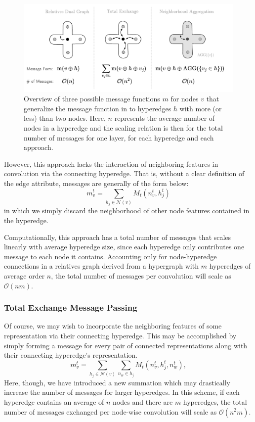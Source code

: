 \documentclass[10pt,a4paper,twocolumn]{article}
\begin{document}
\begin{figure}
	\centering
	\includegraphics[scale=.81]{HMPNN.pdf}
	\caption{Overview of three possible message functions $m$ for nodes $v$ that generalize the message function in \cite{mpnn} to hyperedges $h$ with more (or less) than two nodes. Here, $n$ represents the average number of nodes in a hyperedge and the scaling relation is then for the total number of messages for one layer, for each hyperedge and each approach.}
	\label{fig:hmpnn}
\end{figure}

However, this approach lacks the interaction of neighboring features in convolution via the connecting hyperedge. That is, without a clear definition of the edge attribute, messages are generally of the form below:
$$
m_v^{t} = \sum_{h_j\in \mathcal{N}(v)}M_t(n_v^{t},h_j^{t})
$$
in which we simply discard the neighborhood of other node features contained in the hyperedge.

Computationally, this approach has a total number of messages that scales linearly with average hyperedge size, since each hyperedge only contributes one message to each node it contains.
Accounting only for node-hyperedge connections in a relatives graph derived from a hypergraph with $m$ hyperedges of average order $n$, the total number of messages per convolution will scale as $\mathcal{O}(nm)$.

\subsubsection{Total Exchange Message Passing}
Of course, we may wish to incorporate the neighboring features of some representation via their connecting hyperedge. This may be accomplished by simply forming a message for every pair of connected representations along with their connecting hyperedge's representation.
$$
m_v^{t} = \sum_{h_j\in \mathcal{N}(v)} \sum_{n_w \in h_j } M_t(n_v^{t},h_j^{t}, n_w^t),
$$
Here, though, we have introduced a new summation which may drastically increase the number of messages for larger hyperedges. In this scheme, if each hyperedge contains an average of $n$ nodes and there are $m$ hyperedges, the total number of messages exchanged per node-wise convolution will scale as $\mathcal{O}(n^2m)$.
\end{document}

